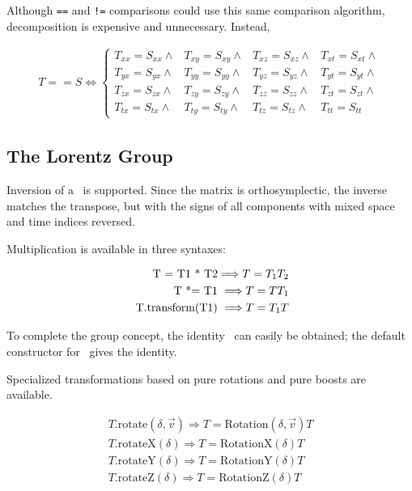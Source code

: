 Although \verb$==$ and \verb$!=$ comparisons could use this same comparison
algorithm, decomposition is expensive and unnecessary.  Instead,

\begin{eqnarray}
\label{eq:ltexact}
  T == S  \Longleftrightarrow 
  \left\{
  \begin{array}{cccc}  
  T_{xx} = S_{xx} \wedge & T_{xy} = S_{xy} \wedge &
  T_{xz} = S_{xz} \wedge & T_{xt} = S_{xt} \wedge \\
  T_{yx} = S_{yx} \wedge & T_{yy} = S_{yy} \wedge &
  T_{yz} = S_{yz} \wedge & T_{yt} = S_{yt} \wedge \\
  T_{zx} = S_{zx} \wedge & T_{zy} = S_{zy} \wedge &
  T_{zz} = S_{zz} \wedge & T_{zt} = S_{zt} \wedge \\
  T_{tx} = S_{tx} \wedge & T_{ty} = S_{ty} \wedge &
  T_{tz} = S_{tz} \wedge & T_{tt} = S_{tt} 
  \end{array}
  \right.
\end{eqnarray}

\subsection{The Lorentz Group}

Inversion of a \LT\ is supported.  Since the matrix is orthosymplectic,
the inverse matches the transpose, but with the signs of all components
with mixed space and time indices reversed.

Multiplication is available in three syntaxes:

\begin{eqnarray}
	\mbox{ T = T1 * T2} \Longrightarrow {\boldmath T = T_1 T_2}
	\\
	\mbox{ T *= T1 } \Longrightarrow {\boldmath T = T T_1 }
	\\
\label{eq:lttrans}
	\mbox{ T.transform(T1) } \Longrightarrow {\boldmath T = T_1 T }
\end{eqnarray}

To complete the group concept, the identity \LT\ can easily be obtained; the
default constructor for \LT\ gives the identity.

Specialized transformations based on pure rotations and pure boosts 
are available.  

\begin{eqnarray}
\label{eq:ltrot}
  T\mbox{.rotate}(\delta, \vec{v}) \Longrightarrow T = 
		\mbox{Rotation}(\delta, \vec{v}) T \\
\nonumber
  T\mbox{.rotateX}(\delta) \Longrightarrow T = \mbox{RotationX}(\delta) T \\
\nonumber
  T\mbox{.rotateY}(\delta) \Longrightarrow T = \mbox{RotationY}(\delta) T \\
\nonumber
  T\mbox{.rotateZ}(\delta) \Longrightarrow T = \mbox{RotationZ}(\delta) T 
\end{eqnarray}

